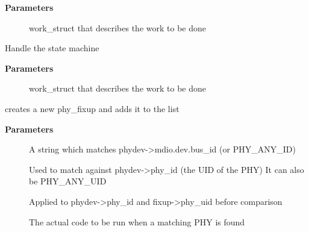 \documentclass[a4paper,8pt,english]{sphinxmanual}
\begin{document}
\textbf{Parameters}
\begin{description}
\item[{}] \leavevmode
work\_struct that describes the work to be done

\end{description}

\begin{fulllineitems}
\label{networking/kapi:c.phy_state_machine}
Handle the state machine

\end{fulllineitems}


\textbf{Parameters}
\begin{description}
\item[{}] \leavevmode
work\_struct that describes the work to be done

\end{description}

\begin{fulllineitems}
\label{networking/kapi:c.phy_register_fixup}
creates a new phy\_fixup and adds it to the list

\end{fulllineitems}


\textbf{Parameters}
\begin{description}
\item[{}] \leavevmode
A string which matches phydev-\textgreater{}mdio.dev.bus\_id (or PHY\_ANY\_ID)

\item[{}] \leavevmode
Used to match against phydev-\textgreater{}phy\_id (the UID of the PHY)
It can also be PHY\_ANY\_UID

\item[{}] \leavevmode
Applied to phydev-\textgreater{}phy\_id and fixup-\textgreater{}phy\_uid before
comparison

\item[{}] \leavevmode
The actual code to be run when a matching PHY is found

\end{description}
\end{document}
